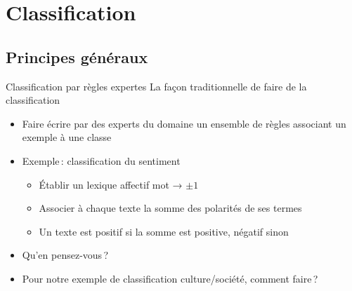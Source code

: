 \documentclass[hyperref={unicode}, xcolor={svgnames}, french]{beamer}
\begin{document}
\section{Classification}

\subsection{Principes généraux}
\begin{frame}{Classification par règles expertes}
    La façon traditionnelle de faire de la classification
    \begin{itemize}
        \item Faire écrire par des experts du domaine un ensemble de règles associant un exemple à une classe
        \item Exemple : classification du sentiment
            \begin{itemize}
                \item Établir un lexique affectif mot → $±1$
                \item Associer à chaque texte la somme des polarités de ses termes
                \item Un texte est positif si la somme est positive, négatif sinon
            \end{itemize}
        \item Qu'en pensez-vous ?
        \item Pour notre exemple de classification culture/société, comment faire ?
    \end{itemize}

\end{frame}
\end{document}
